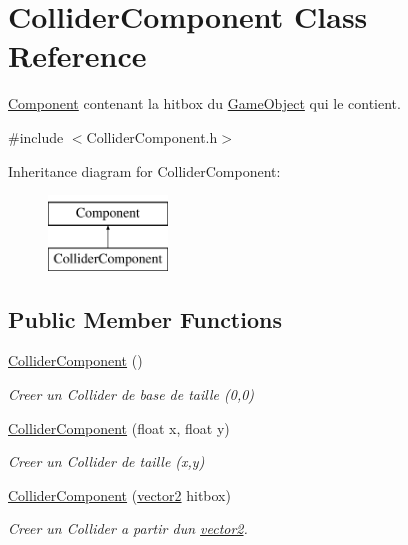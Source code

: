 \hypertarget{class_collider_component}{}\section{Collider\+Component Class Reference}
\label{class_collider_component}


\hyperlink{class_component}{Component} contenant la hitbox du \hyperlink{class_game_object}{Game\+Object} qui le contient.  




{\ttfamily \#include $<$Collider\+Component.\+h$>$}

Inheritance diagram for Collider\+Component\+:\begin{figure}[H]
\begin{center}
\leavevmode
\includegraphics[height=2.000000cm]{class_collider_component}
\end{center}
\end{figure}
\subsection*{Public Member Functions}
\begin{DoxyCompactItemize}
\item 
\hypertarget{class_collider_component_a881902a4586b64d363793a028339d1b7}{}\label{class_collider_component_a881902a4586b64d363793a028339d1b7} 
\hyperlink{class_collider_component_a881902a4586b64d363793a028339d1b7}{Collider\+Component} ()
\begin{DoxyCompactList}\small\item\em Creer un Collider de base de taille (0,0) \end{DoxyCompactList}\item 
\hyperlink{class_collider_component_a879db27a552a7dd9642a8fc6e36616cd}{Collider\+Component} (float x, float y)
\begin{DoxyCompactList}\small\item\em Creer un Collider de taille (x,y) \end{DoxyCompactList}\item 
\hyperlink{class_collider_component_a952c8989df7be45036d88ff5c5ab3e0a}{Collider\+Component} (\hyperlink{structvector2}{vector2} hitbox)
\begin{DoxyCompactList}\small\item\em Creer un Collider a partir d\textquotesingle{}un \hyperlink{structvector2}{vector2}. \end{DoxyCompactList}\end{DoxyCompactItemize}
